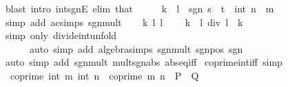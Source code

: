 \begin{isabellebody}
\ {\isacharparenleft}{\kern0pt}blast\ intro{\isacharcolon}{\kern0pt}\ int{\isacharunderscore}{\kern0pt}sgnE\ elim{\isacharcolon}{\kern0pt}\ that{\isacharparenright}{\kern0pt}\isanewline
\ \ \isamarkupfalse%
\ \isamarkupfalse%
\ {\isachardoublequoteopen}k\ {\isacharasterisk}{\kern0pt}\ l\ {\isacharequal}{\kern0pt}\ sgn\ {\isacharparenleft}{\kern0pt}s\ {\isacharasterisk}{\kern0pt}\ t{\isacharparenright}{\kern0pt}\ {\isacharasterisk}{\kern0pt}\ int\ {\isacharparenleft}{\kern0pt}n\ {\isacharasterisk}{\kern0pt}\ m{\isacharparenright}{\kern0pt}{\isachardoublequoteclose}\isanewline
\ \ \ \ \isamarkupfalse%
\ {\isacharparenleft}{\kern0pt}simp\ add{\isacharcolon}{\kern0pt}\ ac{\isacharunderscore}{\kern0pt}simps\ sgn{\isacharunderscore}{\kern0pt}mult{\isacharparenright}{\kern0pt}\isanewline
\ \ \isamarkupfalse%
\ k\ l\ {\isacartoucheopen}l\ {\isasymnoteq}\ {}{\isacartoucheclose}\ \isamarkupfalse%
\ {\isachardoublequoteopen}k\ {\isacharasterisk}{\kern0pt}\ l\ div\ l\ {\isacharequal}{\kern0pt}\ k{\isachardoublequoteclose}\isanewline
\ \ \ \ \isamarkupfalse%
\ {\isacharparenleft}{\kern0pt}simp\ only{\isacharcolon}{\kern0pt}\ divide{\isacharunderscore}{\kern0pt}int{\isacharunderscore}{\kern0pt}unfold{\isacharparenright}{\kern0pt}\isanewline
\ \ \ \ \ \ {\isacharparenleft}{\kern0pt}auto\ simp\ add{\isacharcolon}{\kern0pt}\ algebra{\isacharunderscore}{\kern0pt}simps\ sgn{\isacharunderscore}{\kern0pt}mult\ sgn{\isacharunderscore}{\kern0pt}{}{\isacharunderscore}{\kern0pt}pos\ sgn{\isacharunderscore}{\kern0pt}{}{\isacharunderscore}{\kern0pt}{}{\isacharparenright}{\kern0pt}\isanewline
{}\isamarkupfalse%
\ {\isacharparenleft}{\kern0pt}auto\ simp\ add{\isacharcolon}{\kern0pt}\ sgn{\isacharunderscore}{\kern0pt}mult\ mult{\isacharunderscore}{\kern0pt}sgn{\isacharunderscore}{\kern0pt}abs\ abs{\isacharunderscore}{\kern0pt}eq{\isacharunderscore}{\kern0pt}iff{\isacharprime}{\kern0pt}{\isacharparenright}{\kern0pt}%
\endisatagproof
{\isafoldproof}%
%
\isadelimproof
%
\endisadelimproof
\isanewline
\isanewline
{}\isamarkupfalse%
\isanewline
\isanewline
{}\isamarkupfalse%
\ coprime{\isacharunderscore}{\kern0pt}int{\isacharunderscore}{\kern0pt}iff\ {\isacharbrackleft}{\kern0pt}simp{\isacharbrackright}{\kern0pt}{\isacharcolon}{\kern0pt}\isanewline
\ \ {\isachardoublequoteopen}coprime\ {\isacharparenleft}{\kern0pt}int\ m{\isacharparenright}{\kern0pt}\ {\isacharparenleft}{\kern0pt}int\ n{\isacharparenright}{\kern0pt}\ {\isasymlongleftrightarrow}\ coprime\ m\ n{\isachardoublequoteclose}\ {\isacharparenleft}{\kern0pt}\ {\isachardoublequoteopen}{\isacharquery}{\kern0pt}P\ {\isasymlongleftrightarrow}\ {\isacharquery}{\kern0pt}Q{\isachardoublequoteclose}{\isacharparenright}{\kern0pt}\isanewline

\end{isabellebody}
